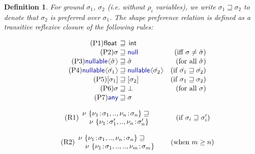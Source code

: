 \documentclass[10pt,preprint,blind,clearpagebib]{sigplanconf}
\newcommand{\langl}{\begin{picture}(4.5,7)
\put(1.1,2.5){\rotatebox{60}{\line(1,0){5.5}}}
\put(1.1,2.5){\rotatebox{300}{\line(1,0){5.5}}}
\end{picture}}
\newcommand{\rangl}{\begin{picture}(4.5,7)
\put(.9,2.5){\rotatebox{120}{\line(1,0){5.5}}}
\put(.9,2.5){\rotatebox{240}{\line(1,0){5.5}}}
\end{picture}}
\newcommand{\kvd}[1]{\textnormal{\textcolor{kvdclr}{\sffamily #1}}}
\newcommand{\ident}[1]{\textnormal{\sffamily #1}}
\newtheorem{definition}{Definition}
\begin{document}
\begin{definition}
For ground $\sigma_1$, $\sigma_2$ (i.e. without $\rho_i$ variables), we write $\sigma_1 \sqsupseteq \sigma_2$ to denote that $\sigma_2$ is preferred over $\sigma_1$. 
The shape preference relation is defined as a transitive reflexive closure of the following rules:

\noindent
\begin{align}
  \label{eq:sub-prim}\tag{P1}
  \ident{float}\,&\sqsupseteq\,\ident{int}&\\[-0.2em]
  \label{eq:sub-null}\tag{P2}
  \sigma &\sqsupseteq \kvd{null}  &(\textnormal{iff}~\sigma \neq \hat{\sigma})  \\[-0.2em]
  \label{eq:sub-opt}\tag{P3}
  \kvd{nullable}\langl\hat{\sigma}\rangl &\sqsupseteq \hat{\sigma}  &(\textnormal{for all}~\hat{\sigma})\\[-0.2em]
  \label{eq:sub-opt-cov}\tag{P4}
  \kvd{nullable}\langl\hat{\sigma_1}\rangl &\sqsupseteq 
    \kvd{nullable}\langl\hat{\sigma_2}\rangl  &(\textnormal{if}~\hat{\sigma_1} \sqsupseteq \hat{\sigma_2})\\[-0.2em]
  \label{eq:sub-col}\tag{P5}
  [\sigma_1] &\sqsupseteq [\sigma_2]  &(\textnormal{if}~\sigma_1 \sqsupseteq \sigma_2) \\[-0.2em]
  \label{eq:sub-bot}\tag{P6}
  \sigma &\sqsupseteq \bot  &(\textnormal{for all}~\sigma)\\[-0.2em]
  \label{eq:sub-var-top}\tag{P7}
  \kvd{any} &\sqsupseteq \sigma 
\end{align}
\vspace{-2em}

\noindent
\begin{align}
\label{eq:sub-record1}\tag{R1}
\begin{array}{l}
 \nu~\{ \nu_1\!:\!\sigma_1, .., \nu_n\!:\!\sigma_n \} \sqsupseteq \\
 \quad\nu~\{ \nu_1\!:\!\sigma_1', .., \nu_n\!:\!\sigma_n' \}
\end{array} \qquad ~~~~(\textnormal{if}~\sigma_i \sqsupseteq \sigma_i')
\end{align}

\vspace{-1.5em}

\begin{align}
\label{eq:sub-record2}\tag{R2}
\begin{array}{l}
 \nu~\{ \nu_1\!:\!\sigma_1, .., \nu_n\!:\!\sigma_n \} \sqsupseteq \\
 \quad\nu~\{ \nu_1\!:\!\sigma_1, .., .., \nu_m\!:\!\sigma_m \}
\end{array} \quad~~\, (\textnormal{when}~m \geq n)
\end{align}

\end{definition}
\end{document}
